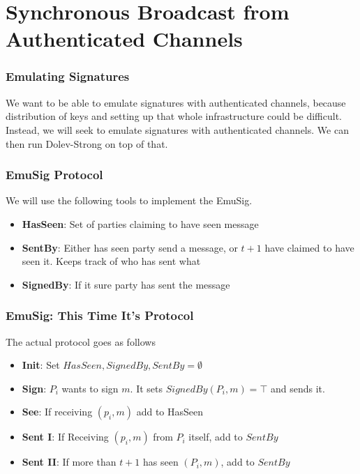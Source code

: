 \section{Synchronous Broadcast from Authenticated Channels}
    \begin{frame}
        \frametitle{Emulating Signatures}
            We want to be able to emulate signatures with authenticated channels, because distribution of keys and setting up that whole infrastructure could be difficult. Instead, we will seek to emulate signatures with authenticated channels. We can then run Dolev-Strong on top of that.
    \end{frame}
        \begin{frame}
            \frametitle{EmuSig Protocol}
                We will use the following tools to implement the EmuSig.
                \begin{itemize}
                    \item \textbf{HasSeen}: Set of parties claiming to have seen message
                    \item \textbf{SentBy}: Either has seen party send a message, or $t+1$ have claimed to have seen it. Keeps track of who has sent what
                    \item \textbf{SignedBy}: If it sure party has sent the message
                \end{itemize}
        \end{frame}
        \begin{frame}
            \frametitle{EmuSig: This Time It's Protocol}
                The actual protocol goes as follows
                \begin{itemize}
                    \item \textbf{Init}: Set $HasSeen, SignedBy, SentBy = \emptyset$
                    \item \textbf{Sign}: $P_i$ wants to sign $m$. It sets $SignedBy(P_i, m) = \top$ and sends it. 
                    \item \textbf{See}: If receiving $(p_i, m)$ add to HasSeen
                    \item \textbf{Sent I}: If Receiving $(p_i, m)$ from $P_i$ itself, add to $SentBy$
                    \item \textbf{Sent II}: If more than $t+1$ has seen $(P_i, m)$, add to $SentBy$
                \end{itemize}
        \end{frame}
